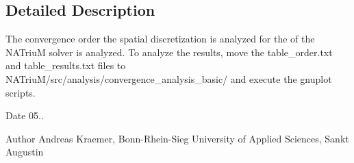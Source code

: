 \subsection{Detailed Description}
The convergence order the spatial discretization is analyzed for the of the N\-A\-Triu\-M solver is analyzed. To analyze the results, move the table\-\_\-order.\-txt and table\-\_\-results.\-txt files to N\-A\-Triu\-M/src/analysis/convergence\-\_\-analysis\-\_\-basic/ and execute the gnuplot scripts. \begin{DoxyDate}{Date}
05.. 
\end{DoxyDate}
\begin{DoxyAuthor}{Author}
Andreas Kraemer, Bonn-\/\-Rhein-\/\-Sieg University of Applied Sciences, Sankt Augustin 
\end{DoxyAuthor}
